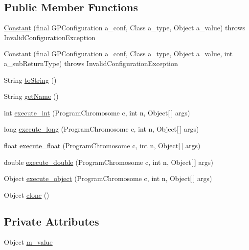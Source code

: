 \subsection*{Public Member Functions}
\begin{DoxyCompactItemize}
\item 
\hyperlink{classorg_1_1jgap_1_1gp_1_1terminal_1_1_constant_a0f54607e1f8487bc1f1f67e3652bc748}{Constant} (final G\-P\-Configuration a\-\_\-conf, Class a\-\_\-type, Object a\-\_\-value)  throws Invalid\-Configuration\-Exception 
\item 
\hyperlink{classorg_1_1jgap_1_1gp_1_1terminal_1_1_constant_aa9363f4ab4f007943b1c3baf889c6e82}{Constant} (final G\-P\-Configuration a\-\_\-conf, Class a\-\_\-type, Object a\-\_\-value, int a\-\_\-sub\-Return\-Type)  throws Invalid\-Configuration\-Exception 
\item 
String \hyperlink{classorg_1_1jgap_1_1gp_1_1terminal_1_1_constant_ae98d36492ff9a8f0d49e9d647d3856ce}{to\-String} ()
\item 
String \hyperlink{classorg_1_1jgap_1_1gp_1_1terminal_1_1_constant_ae1ad8e8c81d65917818a57439e831731}{get\-Name} ()
\item 
int \hyperlink{classorg_1_1jgap_1_1gp_1_1terminal_1_1_constant_a689e5a6b437b0600a83d2a78845e5285}{execute\-\_\-int} (Program\-Chromosome c, int n, Object\mbox{[}$\,$\mbox{]} args)
\item 
long \hyperlink{classorg_1_1jgap_1_1gp_1_1terminal_1_1_constant_a4e1347dcb0f79db10e80c762fe478f06}{execute\-\_\-long} (Program\-Chromosome c, int n, Object\mbox{[}$\,$\mbox{]} args)
\item 
float \hyperlink{classorg_1_1jgap_1_1gp_1_1terminal_1_1_constant_a4d79f0a13b75511faffd19b887e1e958}{execute\-\_\-float} (Program\-Chromosome c, int n, Object\mbox{[}$\,$\mbox{]} args)
\item 
double \hyperlink{classorg_1_1jgap_1_1gp_1_1terminal_1_1_constant_ae11baa68c7cc440b02af47cf479d73e2}{execute\-\_\-double} (Program\-Chromosome c, int n, Object\mbox{[}$\,$\mbox{]} args)
\item 
Object \hyperlink{classorg_1_1jgap_1_1gp_1_1terminal_1_1_constant_a2bff33381d319673fb8ca103bd61fc49}{execute\-\_\-object} (Program\-Chromosome c, int n, Object\mbox{[}$\,$\mbox{]} args)
\item 
Object \hyperlink{classorg_1_1jgap_1_1gp_1_1terminal_1_1_constant_ad436f02d1be2ee7ae2ccf29f46408fa9}{clone} ()
\end{DoxyCompactItemize}
\subsection*{Private Attributes}
\begin{DoxyCompactItemize}
\item 
Object \hyperlink{classorg_1_1jgap_1_1gp_1_1terminal_1_1_constant_a4671deeefccfbaf5d342fe23095ae46e}{m\-\_\-value}
\end{DoxyCompactItemize}
